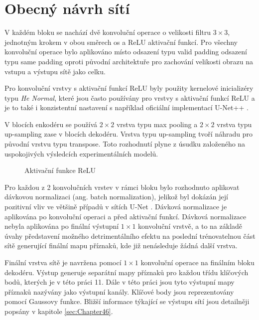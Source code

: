 \section{Obecný návrh sítí}
\label{sec:Chapter42}
V každém bloku se nachází dvě konvoluční operace o velikosti filtru $3\times3$, jednotným krokem v obou směrech os a ReLU aktivační funkcí. Pro všechny konvoluční operace bylo aplikováno místo odsazení typu valid padding odsazení typu same padding oproti původní architektuře \cite{unet} pro zachování velikosti obrazu na vstupu a výstupu sítě jako celku.

Pro konvoluční vrstvy s aktivační funkcí ReLU byly použity kernelové inicializéry typu \textit{He Normal}, které jsou často používány pro vrstvy s aktivační funkcí ReLU \cite{relu_henormal} a je to také i konzistentní nastavení s například oficiální implementací U-Net++ \cite{unetpp_github}. 

V blocích enkodéru se používá $2\times2$ vrstva typu max pooling a $2\times2$ vrstva typu up-sampling zase v blocích dekodéru. Vrstva typu up-sampling tvoří náhradu pro původní vrstvu typu transpose. Toto rozhodnutí plyne z úsudku založeného na uspokojivých výsledcích experimentálních modelů. 

\begin{figure}[ht]
    \centering
    \caption[Aktivační funkce ReLU]{Aktivační funkce ReLU}
    \label{fig:relu}
\end{figure}

Pro každou z 2 konvolučních vrstev v rámci bloku bylo rozhodnuto aplikovat dávkovou normalizaci (ang. batch normalization), jelikož byl dokázán její pozitivní vliv ve většině případů v sítích U-Net \cite{unetnormalization}. Dávková normalizace je aplikována po konvoluční operaci a před aktivační funkcí. Dávková normalizace nebyla aplikována po finální výstupní $1\times1$ konvoluční vrstvě, a to na základě úvahy představení možného detrimentálního efektu na poslední trénovatelnou část sítě generující finální mapu příznaků, kde již nenásleduje žádná další vrstva.

Finální vrstva sítě je navržena pomocí $1\times1$ konvoluční operace na finálním bloku dekodéru. Výstup generuje separátní mapy příznaků pro každou třídu klíčových bodů, kterých je v této práci 11. Dále v této práci jsou tyto výstupní mapy příznaků nazývány jako výstupní kanály. Klíčové body jsou reprezentovány pomocí Gaussovy funkce. Bližší informace týkající se výstupu sítí jsou detailněji popsány v kapitole \ref{sec:Chapter46}.
\endinput